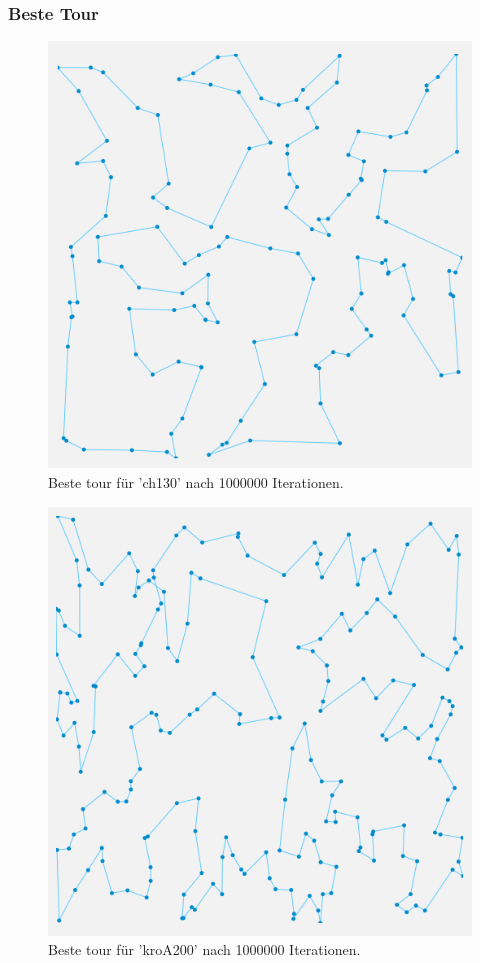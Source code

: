 \documentclass[german,notitlepage,smartquotes]{hgbreport}
\begin{document}
\clearpage
\subsubsection{Beste Tour}

\begin{figure}[h]
\centering
\includegraphics[width=.55\textwidth]{tour-0-1'000'000}
\caption{Beste tour für 'ch130' nach 1000000 Iterationen.}
\label{fig:ch130-1000000}
\end{figure}

\begin{figure}[h]
\centering
\includegraphics[width=.55\textwidth]{tour-1-1'000'000}
\caption{Beste tour für 'kroA200' nach 1000000 Iterationen.}
\label{fig:kroA200-1000000}
\end{figure}






\end{document}
